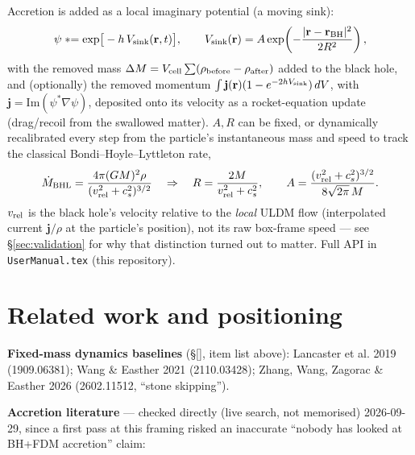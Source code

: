 \documentclass[11pt]{article}
\newcommand{\code}[1]{\texttt{#1}}
\begin{document}
Accretion is added as a local imaginary potential (a moving sink):
\begin{equation}
  \psi \mathrel{*}= \exp\!\big[-h\,V_{\rm sink}(\mathbf r,t)\big], \qquad
  V_{\rm sink}(\mathbf r) = A\exp\!\left(-\frac{|\mathbf r-\mathbf r_{\rm BH}|^2}{2R^2}\right),
\end{equation}
with the removed mass $\Delta M = V_{\rm cell}\sum(\rho_{\rm before}-\rho_{\rm after})$
added to the black hole, and (optionally) the removed momentum
$\int \mathbf j(\mathbf r)(1-e^{-2hV_{\rm sink}})\,dV$, with
$\mathbf j = \mathrm{Im}(\psi^*\nabla\psi)$, deposited onto its velocity as
a rocket-equation update (drag/recoil from the swallowed matter). $A,R$ can
be fixed, or dynamically recalibrated every step from the particle's
instantaneous mass and speed to track the classical Bondi--Hoyle--Lyttleton
rate,
\begin{equation}
  \dot M_{\rm BHL} = \frac{4\pi(GM)^2\rho}{(v_{\rm rel}^2+c_s^2)^{3/2}}
  \quad\Rightarrow\quad
  R = \frac{2M}{v_{\rm rel}^2+c_s^2}, \qquad
  A = \frac{(v_{\rm rel}^2+c_s^2)^{3/2}}{8\sqrt{2\pi}\,M}.
\end{equation}
$v_{\rm rel}$ is the black hole's velocity relative to the \emph{local} ULDM
flow (interpolated current $\mathbf j/\rho$ at the particle's position), not
its raw box-frame speed — see \S\ref{sec:validation} for why that distinction
turned out to matter. Full API in \code{UserManual.tex} (this repository).

\section{Related work and positioning}
\label{sec:related}

\textbf{Fixed-mass dynamics baselines} (\S\ref{}, item list above):
Lancaster et al. 2019 (1909.06381); Wang \& Easther 2021 (2110.03428);
Zhang, Wang, Zagorac \& Easther 2026 (2602.11512, ``stone skipping'').

\textbf{Accretion literature} — checked directly (live search, not
memorised) 2026-09-29, since a first pass at this framing risked an
inaccurate ``nobody has looked at BH+FDM accretion'' claim:
\end{document}
